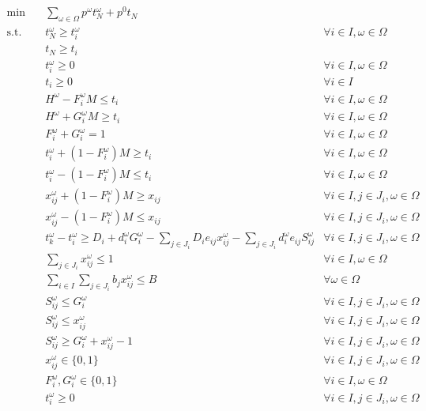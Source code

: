 \documentclass[11pt]{article}
\begin{document}
	\begin{subequations} \label{prob:extensive}
		\begin{align}
			\min \quad & \sum_{\omega \in \Omega} p^\omega t_N^\omega + p^0 t_N& \\
			\text{s.t.} \quad & t_N^\omega \geq t_i^\omega & \forall i \in I, \omega \in \Omega \\
			& t_N \geq t_i & \\
			& t_i^\omega \geq 0 & \forall i \in I, \omega \in \Omega\\
			& t_i \geq 0 & \forall i \in I\\
			& H^\omega - F_i^\omega M \leq t_i & \forall i \in I, \omega \in \Omega \label{cons:f}\\
			& H^\omega + G_i^\omega M \geq t_i & \forall i \in I, \omega \in \Omega \label{cons:g}\\
			& F_i^\omega + G_i^\omega = 1 & \forall i \in I, \omega \in \Omega \label{cons:fg}\\
			& t_i^\omega + (1 - F_i^\omega)M \geq t_i & \forall i \in I, \omega \in \Omega \label{cons:tf1}\\
			& t_i^\omega - (1 - F_i^\omega)M \leq t_i & \forall i \in I, \omega \in \Omega \label{cons:tf2}\\
			& x_{ij}^\omega + (1 - F_i^\omega)M \geq x_{ij} & \forall i \in I, j \in J_i, \omega \in \Omega \label{cons:xf1}\\
			& x_{ij}^\omega - (1 - F_i^\omega)M \leq x_{ij} & \forall i \in I, j \in J_i, \omega \in \Omega \label{cons:xf2}\\
			& t_k^\omega - t_i^\omega \geq D_i + d_i^\omega G_i^\omega -\sum_{j \in J_i} D_i e_{ij} x_{ij}^\omega - \sum_{j \in J_i} d_i^\omega e_{ij} S_{ij}^\omega & \forall i \in I, j \in J_i, \omega \in \Omega \label{cons:duration}\\
			& \sum_{j \in J_i} x_{ij}^\omega \leq 1 & \forall i \in I, \omega \in \Omega \label{cons:crashLim}\\
			& \sum_{i \in I}\sum_{j \in J_i} b_jx_{ij}^\omega \leq B & \forall \omega \in \Omega \label{cons:budget}\\
			& S_{ij}^\omega \leq G_i^\omega & \forall i \in I, j \in J_i, \omega \in \Omega \label{cons:linearize1}\\
			& S_{ij}^\omega \leq x_{ij}^\omega & \forall i \in I, j \in J_i, \omega \in \Omega \label{cons:linearize2}\\
			& S_{ij}^\omega \geq G_i^\omega + x_{ij}^\omega - 1 & \forall i \in I, j \in J_i, \omega \in \Omega \label{cons:linearize3}\\
			& x_{ij}^\omega \in \{0,1\} & \forall i \in I, j \in J_i, \omega \in \Omega\\
			& F_i^\omega, G_i^\omega \in \{0,1\} & \forall i \in I, \omega \in \Omega\\
			& t_{i}^\omega \geq 0 & \forall i \in I, j \in J_i, \omega \in \Omega
		\end{align}
	\end{subequations}
	
\end{document}
